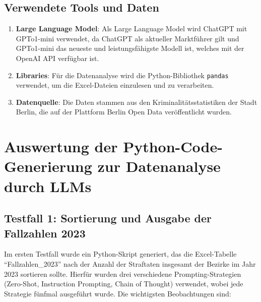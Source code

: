 \documentclass[11pt,a4paper]{article}
\begin{document}
\subsection{Verwendete Tools und Daten}
    \begin{enumerate}
        \item \textbf{Large Language Model}: Als Large Language Model wird ChatGPT mit GPTo1-mini verwendet, da ChatGPT als aktueller Marktführer gilt und GPTo1-mini das neueste und leistungsfähigste Modell ist, welches mit der OpenAI API verfügbar ist.
        \item \textbf{Libraries}: Für die Datenanalyse wird die Python-Bibliothek \texttt{pandas} verwendet, um die Excel-Dateien einzulesen und zu verarbeiten.
        \item \textbf{Datenquelle}: Die Daten stammen aus den Kriminalitätsstatistiken der Stadt Berlin, die auf der Plattform Berlin Open Data veröffentlicht wurden\cite{opendataberlin}.
    \end{enumerate}

\section{Auswertung der Python-Code-Generierung zur Datenanalyse durch LLMs}
\label{sec:auswertung}
\subsection{Testfall 1: Sortierung und Ausgabe der Fallzahlen 2023}
\label{subsec:auswertung_testfall1 }
    
Im ersten Testfall wurde ein Python-Skript generiert, das die Excel-Tabelle \enquote{Fallzahlen\_2023} nach der Anzahl der Straftaten insgesamt der Bezirke im Jahr 2023 sortieren sollte. Hierfür wurden drei verschiedene Prompting-Strategien (Zero-Shot, Instruction Prompting, Chain of Thought) verwendet, wobei jede Strategie fünfmal ausgeführt wurde. Die wichtigsten Beobachtungen sind:
    
\end{document}
